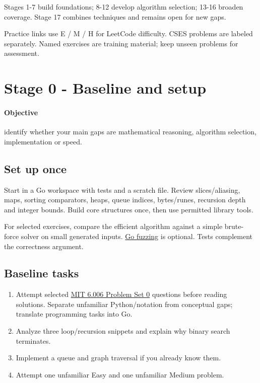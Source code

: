 \documentclass[11pt,letterpaper]{article}
\begin{document}
Stages 1-7 build foundations; 8-12 develop algorithm selection; 13-16 broaden coverage. Stage 17 combines techniques and remains open for new gaps.

Practice links use E / M / H for LeetCode difficulty. CSES problems are labeled separately. Named exercises are training material; keep unseen problems for assessment.

\section{Stage 0 - Baseline and setup}\label{sec:4}

\label{stage:0}

\paragraph*{Objective}

identify whether your main gaps are mathematical reasoning, algorithm selection, implementation or speed.

\subsection*{Set up once}

Start in a Go workspace with tests and a scratch file. Review slices/aliasing, maps, sorting comparators, heaps, queue indices, bytes/runes, recursion depth and integer bounds. Build core structures once, then use permitted library tools.

For selected exercises, compare the efficient algorithm against a simple brute-force solver on small generated inputs. \href{https://go.dev/doc/tutorial/fuzz}{Go fuzzing} is optional. Tests complement the correctness argument.

\subsection*{Baseline tasks}

\begin{enumerate}

\item Attempt selected \href{https://ocw.mit.edu/courses/6-006-introduction-to-algorithms-spring-2020/pages/assignments/}{MIT 6.006 Problem Set 0} questions before reading solutions. Separate unfamiliar Python/\allowbreak notation from conceptual gaps; translate programming tasks into Go.

\item Analyze three loop/recursion snippets and explain why binary search terminates.

\item Implement a queue and graph traversal if you already know them.

\item Attempt one unfamiliar Easy and one unfamiliar Medium problem.

\end{enumerate}
\end{document}
